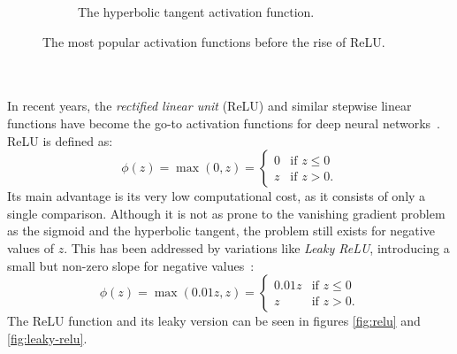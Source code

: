 \begin{figure}
\begin{subfigure}[b]{0.45\textwidth}
        \caption{The hyperbolic tangent activation function.}
        \label{fig:tanh}
    \end{subfigure}
    \caption{The most popular activation functions before the rise of ReLU.}
    \label{fig:tanhsigmoid}
\end{figure}
\\
\\
In recent years, the \textit{rectified linear unit} (ReLU) and similar stepwise linear functions have become the go-to activation functions for deep neural networks~\cite[chapter 6.3.2]{goodfellow_deep_2016}\cite{dubey_activation_2022}.
ReLU is defined as:
\begin{equation}
    \phi(z) = \max(0, z) = \begin{cases}
        0 & \text{if } z \leq 0 \\
        z & \text{if } z > 0 \text{.}
    \end{cases}
    \label{eq:relu}
\end{equation}
Its main advantage is its very low computational cost, as it consists of only a single comparison. 
Although it is not as prone to the vanishing gradient problem as the sigmoid and the hyperbolic tangent, the problem still exists for negative values of $z$. 
This has been addressed by variations like \textit{Leaky ReLU}, introducing a small but non-zero slope for negative values~\cite{dubey_activation_2022}:
\begin{equation}
    \phi(z) = \max(0.01 z, z) = \begin{cases}
        0.01 z & \text{if } z \leq 0 \\
        z & \text{if } z > 0 \text{.}
    \end{cases}
    \label{eq:leaky-relu}
\end{equation}
The ReLU function and its leaky version can be seen in figures \ref{fig:relu} and \ref{fig:leaky-relu}.
